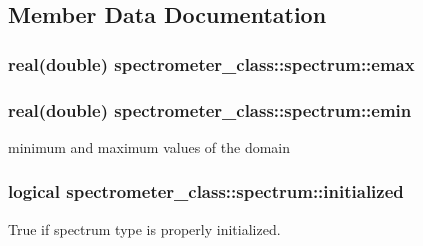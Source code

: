 \subsection{Member Data Documentation}
\hypertarget{structspectrometer__class_1_1spectrum_a19c8c0ef9b07c698ad2ec0f72f0992bf}{
\subsubsection[{emax}]{\setlength{\rightskip}{0pt plus 5cm}real(double) spectrometer\+\_\+class\+::spectrum\+::emax\hspace{0.3cm}{\ttfamily [private]}}}\label{structspectrometer__class_1_1spectrum_a19c8c0ef9b07c698ad2ec0f72f0992bf}
\hypertarget{structspectrometer__class_1_1spectrum_a257027f221a5344e222be1b9336f6c9c}{
\subsubsection[{emin}]{\setlength{\rightskip}{0pt plus 5cm}real(double) spectrometer\+\_\+class\+::spectrum\+::emin\hspace{0.3cm}{\ttfamily [private]}}}\label{structspectrometer__class_1_1spectrum_a257027f221a5344e222be1b9336f6c9c}


minimum and maximum values of the domain 

\hypertarget{structspectrometer__class_1_1spectrum_a81dd1f90a12fcc317ae95c3855aa3d29}{
\subsubsection[{initialized}]{\setlength{\rightskip}{0pt plus 5cm}logical spectrometer\+\_\+class\+::spectrum\+::initialized\hspace{0.3cm}{\ttfamily [private]}}}\label{structspectrometer__class_1_1spectrum_a81dd1f90a12fcc317ae95c3855aa3d29}


True if spectrum type is properly initialized. 

